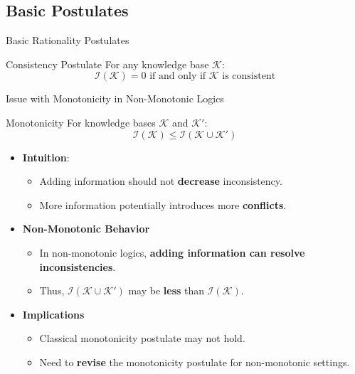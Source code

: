 \subsection{Basic Postulates}

\begin{frame}{Basic Rationality Postulates}
    \begin{block}{Consistency Postulate}
        For any knowledge base \( \mathcal{K} \):
        \[
            \mathcal{I}(\mathcal{K}) = 0 \text{ if and only if } \mathcal{K} \text{ is consistent}
        \]
    \end{block}
\end{frame}

\begin{frame}{Issue with Monotonicity in Non-Monotonic Logics}
    \begin{alertblock}{Monotonicity}
        For knowledge bases \( \mathcal{K} \) and \( \mathcal{K}' \):
        \[
            \mathcal{I}(\mathcal{K}) \leq \mathcal{I}(\mathcal{K} \cup \mathcal{K}')
        \]
    \end{alertblock}
    \begin{itemize}
        \item \textbf{Intuition}:
              \begin{itemize}
                  \item Adding information should not \textbf{decrease} inconsistency.
                  \item More information potentially introduces more \textbf{conflicts}.
              \end{itemize}
    \end{itemize}
    \begin{itemize}
        \item \textbf{Non-Monotonic Behavior}
              \begin{itemize}
                  \item In non-monotonic logics, \textbf{adding information can resolve inconsistencies}.
                  \item Thus, \( \mathcal{I}(\mathcal{K} \cup \mathcal{K}') \) may be \textbf{less} than \( \mathcal{I}(\mathcal{K}) \).
              \end{itemize}
        \item \textbf{Implications}
              \begin{itemize}
                  \item Classical monotonicity postulate may not hold.
                  \item Need to \textbf{revise} the monotonicity postulate for non-monotonic settings.
              \end{itemize}
    \end{itemize}
\end{frame}

